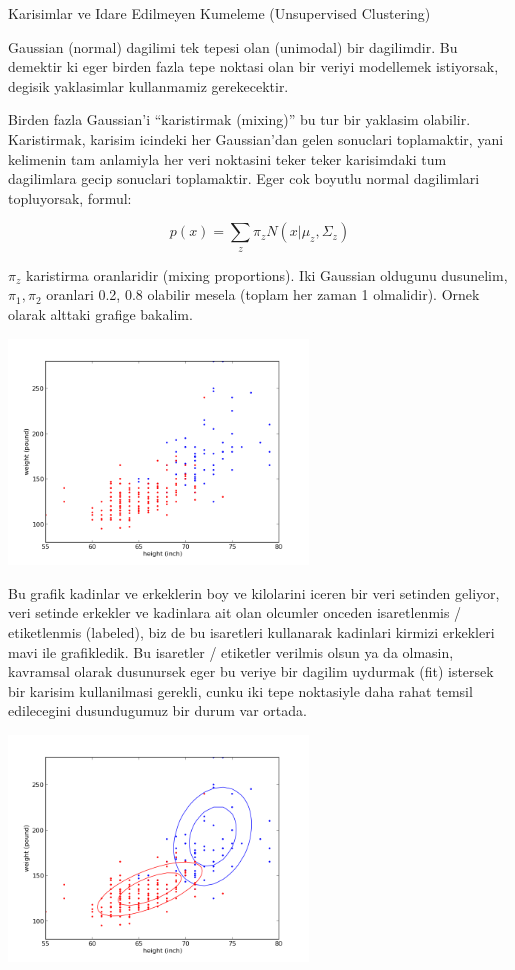 \documentclass[12pt,fleqn]{article}\usepackage{../common}
\begin{document}
Karisimlar ve Idare Edilmeyen Kumeleme (Unsupervised Clustering)

Gaussian (normal) dagilimi tek tepesi olan (unimodal) bir dagilimdir. Bu
demektir ki eger birden fazla tepe noktasi olan bir veriyi modellemek
istiyorsak, degisik yaklasimlar kullanmamiz gerekecektir. 

Birden fazla Gaussian'i ``karistirmak (mixing)'' bu tur bir yaklasim
olabilir. Karistirmak, karisim icindeki her Gaussian'dan gelen sonuclari
toplamaktir, yani kelimenin tam anlamiyla her veri noktasini teker teker
karisimdaki tum dagilimlara gecip sonuclari toplamaktir. Eger cok boyutlu
normal dagilimlari topluyorsak, formul:

\[ p(x) = \sum_z \pi_z N(x | \mu_z,\Sigma_z) \]

$\pi_z$ karistirma oranlaridir (mixing proportions). Iki Gaussian oldugunu
dusunelim, $\pi_1,\pi_2$ oranlari 0.2, 0.8 olabilir mesela (toplam her
zaman 1 olmalidir). Ornek olarak alttaki grafige bakalim.


\includegraphics[height=6cm]{plotbio.png}

Bu grafik kadinlar ve erkeklerin boy ve kilolarini iceren bir veri setinden
geliyor, veri setinde erkekler ve kadinlara ait olan olcumler onceden
isaretlenmis / etiketlenmis (labeled), biz de bu isaretleri kullanarak
kadinlari kirmizi erkekleri mavi ile grafikledik. Bu isaretler / etiketler
verilmis olsun ya da olmasin, kavramsal olarak dusunursek eger bu veriye
bir dagilim uydurmak (fit) istersek bir karisim kullanilmasi gerekli, cunku
iki tepe noktasiyle daha rahat temsil edilecegini dusundugumuz bir durum
var ortada.

\includegraphics[height=6cm]{plotbio_cluster.png}
\end{document}
